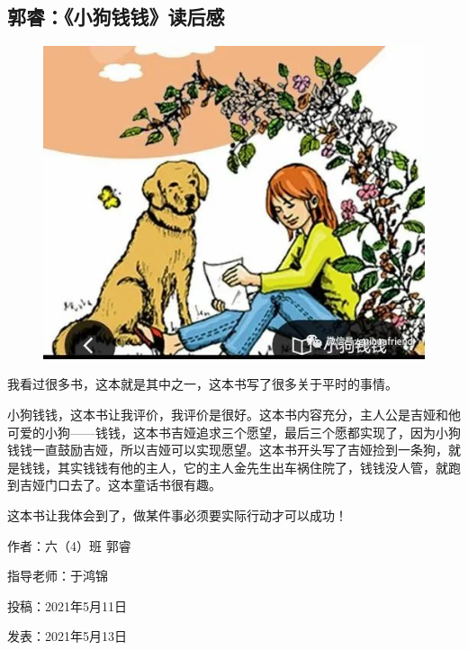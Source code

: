 \vspace{10pt}

{\centering\subsection*{郭睿：《小狗钱钱》读后感}}


\renewcommand{\leftmark}{郭睿：《小狗钱钱》读后感}

\begin{figure}[htbp]

\centering

\includegraphics[width = .5\textwidth]{./ch/25.jpg}

\end{figure}



我看过很多书，这本就是其中之一，这本书写了很多关于平时的事情。

小狗钱钱，这本书让我评价，我评价是很好。这本书内容充分，主人公是吉娅和他可爱的小狗——钱钱，这本书吉娅追求三个愿望，最后三个愿都实现了，因为小狗钱钱一直鼓励吉娅，所以吉娅可以实现愿望。这本书开头写了吉娅捡到一条狗，就是钱钱，其实钱钱有他的主人，它的主人金先生出车祸住院了，钱钱没人管，就跑到吉娅门口去了。这本童话书很有趣。

这本书让我体会到了，做某件事必须要实际行动才可以成功！





\vspace{10pt}



作者：六（4）班 郭睿



指导老师：于鸿锦



投稿：2021年5月11日



发表：2021年5月13日






                



\vspace{10pt}

\hline



